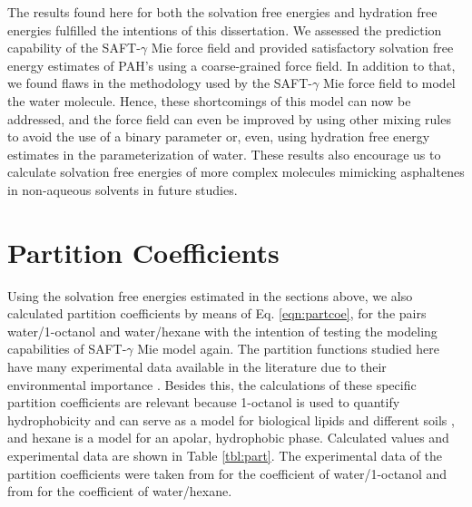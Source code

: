 The results found here for both the solvation free energies and hydration free energies fulfilled the intentions of this dissertation. We assessed the prediction capability of the SAFT-$\gamma$ Mie force field and provided satisfactory solvation free energy estimates of PAH's using a coarse-grained force field. In addition to that, we found flaws in the methodology used by the SAFT-$\gamma$ Mie force field to model the water molecule. Hence, these shortcomings of this model can now be addressed, and the force field can even be improved by using other mixing rules to avoid the use of a binary parameter or, even, using hydration free energy estimates in the parameterization of water. These results also encourage us to calculate solvation free energies of more complex molecules mimicking asphaltenes in non-aqueous solvents in future studies.  

\section{Partition Coefficients}

Using the solvation free energies estimated in the sections above, we also calculated partition coefficients by means of Eq. \eqref{eqn:partcoe}, for the pairs  water/1-octanol and water/hexane with the intention of testing the modeling capabilities of SAFT-$\gamma$ Mie model again. The partition functions studied here have many experimental data available in the literature due to their environmental importance \cite{sangster}. Besides this, the calculations of these specific partition coefficients are relevant because   1-octanol is used to quantify hydrophobicity and can serve as a model for biological lipids and different soils \cite{RUELLE2000457}, and hexane is a model for an apolar, hydrophobic phase. Calculated values and experimental data are shown in Table \ref{tbl:part}. The experimental data of the partition coefficients were taken from   \cite{POOLE2000117,sangster} for the coefficient of water/1-octanol and from \cite{doi:10.1021/je970112e} for the coefficient of water/hexane. 

